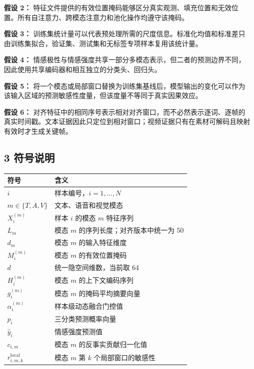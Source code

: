 \documentclass[
  12pt,
  a4paper,
]{ctexart}
\begin{document}
\textbf{假设 2：}
特征文件提供的有效位置掩码能够区分真实观测、填充位置和无效位置。所有自注意力、跨模态注意力和池化操作均遵守该掩码。

\textbf{假设 3：}
训练集统计量可以代表预处理所需的尺度信息。标准化均值和标准差只由训练集拟合，验证集、测试集和无标签专项样本复用该统计量。

\textbf{假设 4：}
情感极性与情感强度共享一部分多模态表示，但二者的预测边界不同，因此使用共享编码器和相互独立的分类头、回归头。

\textbf{假设 5：}
将一个模态或局部窗口替换为训练集基线后，模型输出的变化可以作为该输入区域的预测敏感性度量，但该度量不等同于真实因果效应。

\textbf{假设 6：}
对齐特征中的相同序号表示相对对齐窗口，而不必然表示逐词、逐帧的真实时间戳。文本证据因此只定位到相对窗口；视频证据只有在素材可解码且映射有效时才生成关键帧。

\hypertarget{ux7b26ux53f7ux8bf4ux660e}{%
\subsection{3 符号说明}\label{ux7b26ux53f7ux8bf4ux660e}}

\begin{longtable}[]{@{}ll@{}}
\toprule
符号 & 含义 \\
\midrule
\endhead
\(i\) & 样本编号，\(i=1,\ldots,N\) \\
\(m\in\{T,A,V\}\) & 文本、语音和视觉模态 \\
\(X_i^{(m)}\) & 样本 \(i\) 的模态 \(m\) 特征序列 \\
\(L_m\) & 模态 \(m\) 的序列长度；对齐版本中统一为 50 \\
\(d_m\) & 模态 \(m\) 的输入特征维度 \\
\(M_i^{(m)}\) & 模态 \(m\) 的有效位置掩码 \\
\(d\) & 统一隐空间维数，当前取 64 \\
\(H_i^{(m)}\) & 模态 \(m\) 的上下文编码序列 \\
\(g_i^{(m)}\) & 模态 \(m\) 的掩码平均摘要向量 \\
\(\alpha_i^{(m)}\) & 样本级动态融合门控值 \\
\(p_i\) & 三分类预测概率向量 \\
\(\hat y_i\) & 情感强度预测值 \\
\(c_{i,m}\) & 模态 \(m\) 的反事实贡献归一化值 \\
\(r_{i,m,k}^{\mathrm{local}}\) & 模态 \(m\) 第 \(k\)
个局部窗口的敏感性 \\
\bottomrule
\end{longtable}
\end{document}
